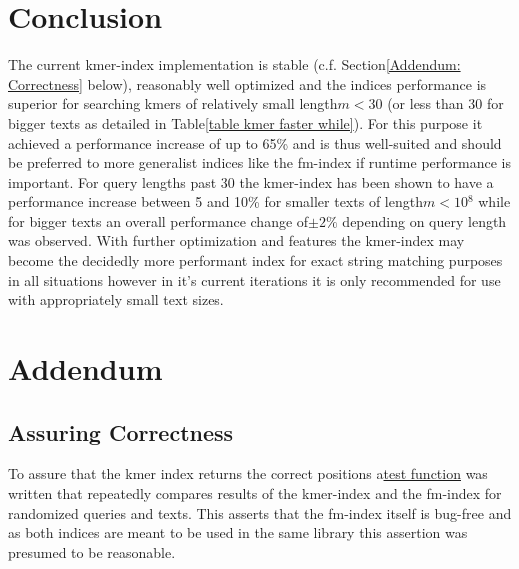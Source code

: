 \section{Conclusion}

The current kmer-index implementation is stable (c.f. Section\ref{Addendum: Correctness}
below), reasonably well optimized and the indices performance is superior
for searching kmers of relatively small length$m<30$ (or less than
30 for bigger texts as detailed in Table\ref{table kmer faster while}).
For this purpose it achieved a performance increase of up to 65\%
and is thus well-suited and should be preferred to more generalist
indices like the fm-index if runtime performance is important. For
query lengths past 30 the kmer-index has been shown to have a performance
increase between 5 and 10\% for smaller texts of length$m<10{{}^8}$
while for bigger texts an overall performance change of$\pm2\%$ depending
on query length was observed. With further optimization and features
the kmer-index may become the decidedly more performant index for
exact string matching purposes in all situations however in it's current
iterations it is only recommended for use with appropriately small
text sizes.

\newpage{}

\section{Addendum}

\subsection{\label{Addendum: Correctness}Assuring Correctness}

To assure that the kmer index returns the correct positions a\href{https://github.com/google/googletest}{test function}
was written that repeatedly compares results of the kmer-index and
the fm-index for randomized queries and texts. This asserts that the
fm-index itself is bug-free and as both indices are meant to be used
in the same library this assertion was presumed to be reasonable.

